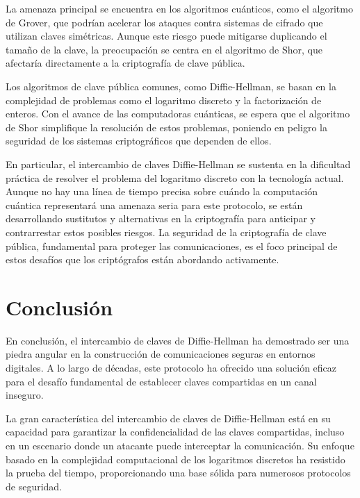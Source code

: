 \documentclass[11pt]{article}
\begin{document}
La amenaza principal se encuentra en los algoritmos cuánticos, como el algoritmo de Grover, que podrían acelerar los ataques contra sistemas de cifrado que utilizan claves simétricas. Aunque este riesgo puede mitigarse duplicando el tamaño de la clave, la preocupación se centra en el algoritmo de Shor, que afectaría directamente a la criptografía de clave pública.

\newpage

Los algoritmos de clave pública comunes, como Diffie-Hellman, se basan en la complejidad de problemas como el logaritmo discreto y la factorización de enteros. Con el avance de las computadoras cuánticas, se espera que el algoritmo de Shor simplifique la resolución de estos problemas, poniendo en peligro la seguridad de los sistemas criptográficos que dependen de ellos.

En particular, el intercambio de claves Diffie-Hellman se sustenta en la dificultad práctica de resolver el problema del logaritmo discreto con la tecnología actual. Aunque no hay una línea de tiempo precisa sobre cuándo la computación cuántica representará una amenaza seria para este protocolo, se están desarrollando sustitutos y alternativas en la criptografía para anticipar y contrarrestar estos posibles riesgos. La seguridad de la criptografía de clave pública, fundamental para proteger las comunicaciones, es el foco principal de estos desafíos que los criptógrafos están abordando activamente.


\section{Conclusión}
En conclusión, el intercambio de claves de Diffie-Hellman ha demostrado ser una piedra angular en la construcción de comunicaciones seguras en entornos digitales. A lo largo de décadas, este protocolo ha ofrecido una solución eficaz para el desafío fundamental de establecer claves compartidas en un canal inseguro.

La gran característica del intercambio de claves de Diffie-Hellman está en su capacidad para garantizar la confidencialidad de las claves compartidas, incluso en un escenario donde un atacante puede interceptar la comunicación. Su enfoque basado en la complejidad computacional de los logaritmos discretos ha resistido la prueba del tiempo, proporcionando una base sólida para numerosos protocolos de seguridad.
\end{document}
